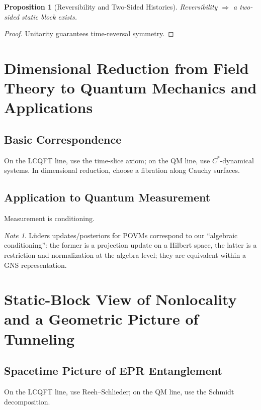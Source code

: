 \documentclass[11pt]{article}
\newtheorem{proposition}[theorem]{Proposition}
\theoremstyle{definition}
\theoremstyle{remark}
\newtheorem*{note}{Note}
\begin{document}
\begin{proposition}[Reversibility and Two-Sided Histories]\label{prop:reversibility}
Reversibility \( \Rightarrow \) a two-sided static block exists.
\end{proposition}

\begin{proof}
Unitarity guarantees time-reversal symmetry.
\end{proof}

\section{Dimensional Reduction from Field Theory to Quantum Mechanics and Applications}\label{sec:reduction}

\subsection{Basic Correspondence}

On the LCQFT line, use the time-slice axiom; on the QM line, use \( C^* \)-dynamical systems. In dimensional reduction, choose a fibration along Cauchy surfaces.

\subsection{Application to Quantum Measurement}

Measurement is conditioning.

\begin{note}
Lüders updates/posteriors for POVMs correspond to our ``algebraic conditioning'': the former is a projection update on a Hilbert space, the latter is a restriction and normalization at the algebra level; they are equivalent within a GNS representation.
\end{note}

\section{Static-Block View of Nonlocality and a Geometric Picture of Tunneling}\label{sec:nonlocality}

\subsection{Spacetime Picture of EPR Entanglement}

On the LCQFT line, use Reeh--Schlieder; on the QM line, use the Schmidt decomposition.
\end{document}
